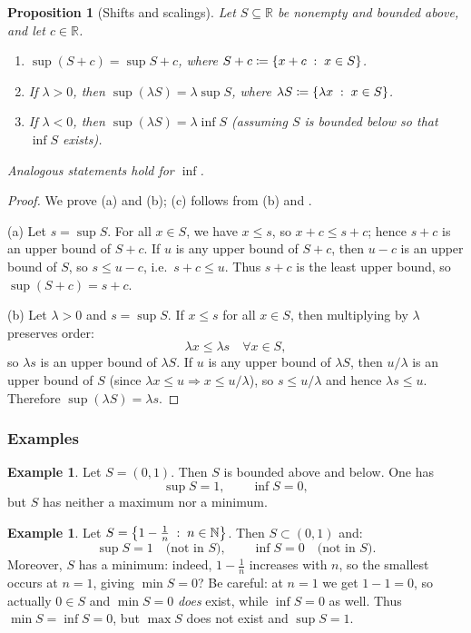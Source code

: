 \documentclass[12pt]{article}
\numberwithin{equation}{section}
\newcommand{\RR}{\mathbb{R}}
\newcommand{\NN}{\mathbb{N}}
\DeclarePairedDelimiter{\set}{\{}{\}}
\newcommand{\st}{\;:\;}                      %
\theoremstyle{plain}
\newtheorem{proposition}[theorem]{Proposition}
\theoremstyle{definition}
\newtheorem{example}[theorem]{Example}
\theoremstyle{remark}
\begin{document}
\begin{proposition}[Shifts and scalings]\label{prop:sup-algebra}
Let $S\subseteq\RR$ be nonempty and bounded above, and let $c\in\RR$.
\begin{enumerate}[label=(\alph*)]
\item $\sup(S+c)=\sup S + c$, where $S+c\coloneqq \set*{x+c \st x\in S}$.
\item If $\lambda>0$, then $\sup(\lambda S)=\lambda \sup S$, where $\lambda S\coloneqq \set*{\lambda x \st x\in S}$.
\item If $\lambda<0$, then $\sup(\lambda S)=\lambda \inf S$ (assuming $S$ is bounded below so that $\inf S$ exists).
\end{enumerate}
Analogous statements hold for $\inf$.
\end{proposition}

\begin{proof}
We prove (a) and (b); (c) follows from (b) and .

(a) Let $s=\sup S$. For all $x\in S$, we have $x\le s$, so $x+c\le s+c$; hence $s+c$ is an upper bound of $S+c$.
If $u$ is any upper bound of $S+c$, then $u-c$ is an upper bound of $S$, so $s\le u-c$, i.e.\ $s+c\le u$.
Thus $s+c$ is the least upper bound, so $\sup(S+c)=s+c$.

(b) Let $\lambda>0$ and $s=\sup S$. If $x\le s$ for all $x\in S$, then multiplying by $\lambda$ preserves order:
\[
\lambda x \le \lambda s \quad \forall x\in S,
\]
so $\lambda s$ is an upper bound of $\lambda S$.
If $u$ is any upper bound of $\lambda S$, then $u/\lambda$ is an upper bound of $S$ (since $\lambda x\le u \Rightarrow x\le u/\lambda$),
so $s\le u/\lambda$ and hence $\lambda s\le u$.
Therefore $\sup(\lambda S)=\lambda s$.
\end{proof}

\subsubsection{Examples}

\begin{example}
Let $S=(0,1)$. Then $S$ is bounded above and below. One has
\[
\sup S = 1,\qquad \inf S = 0,
\]
but $S$ has neither a maximum nor a minimum.
\end{example}

\begin{example}
Let $S=\set*{1-\frac{1}{n} \st n\in\NN}$. Then $S\subset(0,1)$ and:
\[
\sup S = 1 \quad\text{(not in $S$)},\qquad \inf S = 0 \quad\text{(not in $S$)}.
\]
Moreover, $S$ has a minimum: indeed, $1-\frac{1}{n}$ increases with $n$, so the smallest occurs at $n=1$, giving $\min S=0$?  
Be careful: at $n=1$ we get $1-1=0$, so actually $0\in S$ and $\min S=0$ \emph{does} exist, while $\inf S=0$ as well.
Thus $\min S=\inf S=0$, but $\max S$ does not exist and $\sup S=1$.
\end{example}
\end{document}
